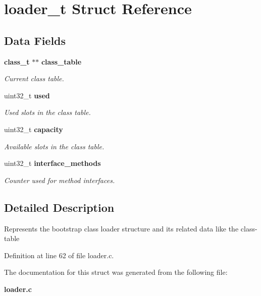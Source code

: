 \section{loader\_\-t Struct Reference}
\label{structloader__t}
\subsection*{Data Fields}
\begin{DoxyCompactItemize}
\item 
{\bf class\_\-t} $\ast$$\ast$ {\bf class\_\-table}\label{structloader__t_af93bcffab38603eb4238dded74db9d60}

\begin{DoxyCompactList}\small\item\em Current class table. \item\end{DoxyCompactList}\item 
uint32\_\-t {\bf used}\label{structloader__t_a9c65fe94fc714556e4e34d8546c42308}

\begin{DoxyCompactList}\small\item\em Used slots in the class table. \item\end{DoxyCompactList}\item 
uint32\_\-t {\bf capacity}\label{structloader__t_aea5af9d4721b4a9fb905799c3704308a}

\begin{DoxyCompactList}\small\item\em Available slots in the class table. \item\end{DoxyCompactList}\item 
uint32\_\-t {\bf interface\_\-methods}\label{structloader__t_ae481ec3fe3d6b3386b2356214ae2340d}

\begin{DoxyCompactList}\small\item\em Counter used for method interfaces. \item\end{DoxyCompactList}\end{DoxyCompactItemize}


\subsection{Detailed Description}
Represents the bootstrap class loader structure and its related data like the class-\/table 

Definition at line 62 of file loader.c.



The documentation for this struct was generated from the following file:\begin{DoxyCompactItemize}
\item 
{\bf loader.c}\end{DoxyCompactItemize}
